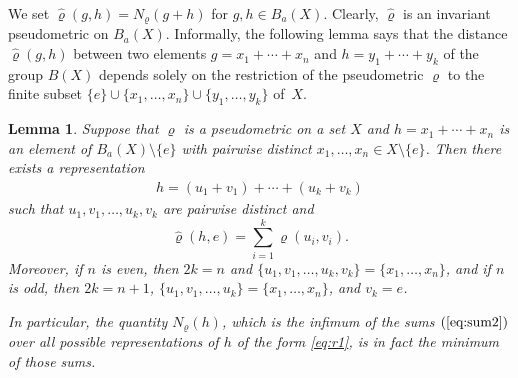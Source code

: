 \documentclass[a4paper,12pt]{amsart}
\def\sm{\setminus}
\newtheorem{lemma}[theorem]{Lemma}
\theoremstyle{definition}
\begin{document}
We set $\widehat{\varrho}(g,h)= N_\varrho(g+h)$ for $g,h\in B_a(X)$. Clearly, 
$\widehat \varrho$ is an invariant pseudometric on $B_a(X)$. 
Informally, the following lemma says that the distance $\widehat{\varrho}(g,h)$ 
between two elements $g=x_1+ \cdots+x_n$ and $h=y_1+\cdots+y_k$ of the group 
$B(X)$ depends solely on the restriction of the 
pseudometric $\varrho$ 
to the finite 
subset $\{e\}\cup \{x_1,\ldots,x_n\} 
\cup\{y_1,\ldots,y_k\}$ of~$X$.

\begin{lemma}\label{Le:clearer}
Suppose that $\varrho$ is a pseudometric on a set $X$ and 
$h=x_1+\cdots+x_n$ is an element of $B_a(X)\sm\{e\}$ 
with pairwise distinct $x_1,\ldots,x_n\in X\sm\{e\}$. Then 
there exists a representation
\begin{eqnarray*}
h=(u_1+v_1)+\cdots+(u_k+v_k) 
\end{eqnarray*}
such that $u_1,v_1,\ldots,u_k,v_k$ are  pairwise distinct and 
$$
\widehat{\varrho}(h,e)=\sum_{i=1}^k \varrho(u_i,v_i). 
$$
Moreover, if $n$ is even, then $2k=n$ and $\{u_1,v_1,\ldots,u_k,v_k\}=
\{x_1,\ldots,\allowbreak x_n\}$, and if $n$ is odd, then $2k=n+1$, 
$\{u_1,v_1,\ldots,u_k\}=\{x_1,\ldots, x_n\}$, and $v_k=e$. 

In particular, the quantity $N_\varrho(h)$, which is 
the infimum of the sums $(\ref{eq:sum2})$ over all possible representations 
of $h$ of the form \eqref{eq:r1}, is in fact the minimum of those sums. 
\end{lemma}
\end{document}
